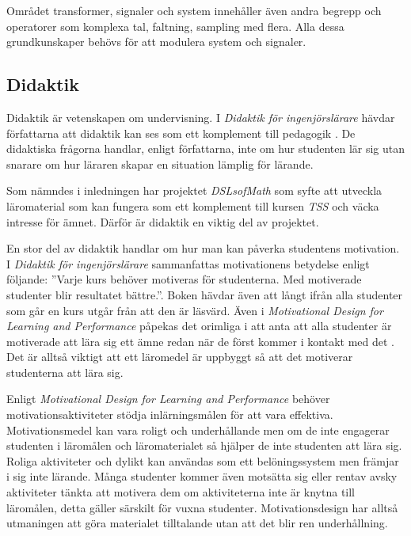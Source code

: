 \documentclass[]{article}
\begin{document}
Området transformer, signaler och system innehåller även andra begrepp
och operatorer som komplexa tal, faltning, sampling med flera. Alla
dessa grundkunskaper behövs för att modulera system och signaler.

\subsection{Didaktik}
Didaktik är vetenskapen om undervisning. I \textit{Didaktik för
 ingenjörslärare} hävdar författarna att didaktik kan ses som ett
komplement till pedagogik \cite{didaktik_for_ingenjorslarare}. De didaktiska frågorna handlar, enligt
författarna, inte om hur studenten lär sig utan snarare om hur läraren
skapar en situation lämplig för lärande.

Som nämndes i inledningen har projektet \textit{DSLsofMath}
 som syfte att utveckla läromaterial som kan fungera som ett
komplement till kursen \textit{TSS} och väcka intresse för ämnet.
Därför är didaktik en viktig del av projektet.

En stor del av didaktik handlar om hur man kan påverka studentens
motivation. I \textit{Didaktik för ingenjörslärare} sammanfattas
motivationens betydelse enligt följande: ”Varje kurs behöver motiveras
för studenterna. Med motiverade studenter blir resultatet bättre.”.
Boken hävdar även att långt ifrån alla studenter som går en kurs utgår
från att den är läsvärd. Även i \textit{Motivational Design for
 Learning and Performance} påpekas det orimliga i att anta att alla
studenter är motiverade att lära sig ett ämne redan när de först
kommer i kontakt med det \cite{motivational_design}. Det är alltså viktigt att ett läromedel är
uppbyggt så att det motiverar studenterna att lära sig.

Enligt \textit{Motivational Design for Learning and Performance}
behöver motivations\-aktiviteter stödja inlärningsmålen för att vara
effektiva. Motivationsmedel kan vara roligt och underhållande men om
de inte engagerar studenten i läromålen och läromaterialet så hjälper
de inte studenten att lära sig. Roliga aktiviteter och dylikt kan
användas som ett belöningssystem men främjar i sig inte lärande. Många
studenter kommer även motsätta sig eller rentav avsky aktiviteter
tänkta att motivera dem om aktiviteterna inte är knytna till
läromålen, detta gäller särskilt för vuxna studenter.
Motivationsdesign har alltså utmaningen att göra materialet
tilltalande utan att det blir ren underhållning.
\end{document}
